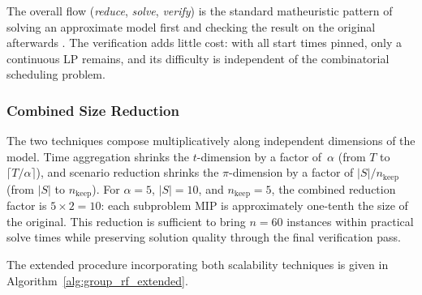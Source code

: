 The overall flow (\emph{reduce}, \emph{solve}, \emph{verify}) is
the standard matheuristic pattern of solving an approximate model
first and checking the result on the original afterwards
\parencite{Maniezzo2010}. The verification adds little cost:
with all start times pinned, only a continuous LP remains, and
its difficulty is independent of the combinatorial scheduling
problem.

\subsubsection*{Combined Size Reduction}

The two techniques compose multiplicatively along independent
dimensions of the model. Time aggregation shrinks the
$t$-dimension by a factor of~$\alpha$ (from $T$ to
$\lceil T/\alpha \rceil$), and scenario reduction shrinks the
$\pi$-dimension by a factor of
$|S|/n_{\mathrm{keep}}$ (from $|S|$ to $n_{\mathrm{keep}}$).
For $\alpha = 5$, $|S| = 10$, and $n_{\mathrm{keep}} = 5$,
the combined reduction factor is
$5 \times 2 = 10$: each subproblem MIP is approximately
one-tenth the size of the original. This reduction is sufficient to bring
$n = 60$ instances within practical solve times while preserving
solution quality through the final verification pass.

The extended procedure incorporating both scalability techniques
is given in Algorithm~\ref{alg:group_rf_extended}.

